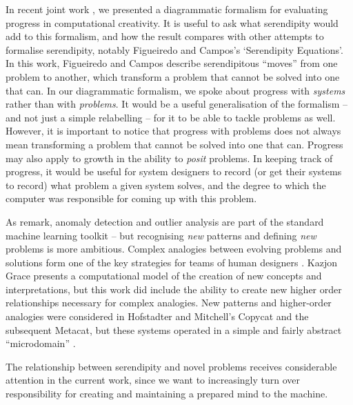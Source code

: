 In recent joint work \cite{colton-assessingprogress}, we presented a
diagrammatic formalism for evaluating progress in computational
creativity.  It is useful to ask what serendipity would add to this
formalism, and how the result compares with other attempts to
formalise serendipity, notably Figueiredo and Campos's
\citeyear{Figueiredo2001} `Serendipity Equations'.  In this work,
Figueiredo and Campos describe serendipitous ``moves'' from one
problem to another, which transform a problem that cannot be solved
into one that can.  In our diagrammatic formalism, we spoke about
progress with \emph{systems} rather than with \emph{problems}.  It
would be a useful generalisation of the formalism -- and not just a
simple relabelling -- for it to be able to tackle problems as well.
However, it is important to notice that progress with problems does not always mean transforming a
problem that cannot be solved into one that can.  Progress may also
apply to growth in the ability to \emph{posit} problems.  In keeping
track of progress, it would be useful for system designers to record
(or get their systems to record) what problem a given system solves,
and the degree to which the computer was responsible for coming up
with this problem.

As \cite[p. 69]{pease2013discussion} remark, anomaly detection and
outlier analysis are part of the standard machine learning toolkit --
but recognising \emph{new} patterns and defining \emph{new} problems
is more ambitious.  Complex analogies between evolving problems and
solutions form one of the key strategies for teams of human designers
\cite{Analogical-problem-evolution-DCC}.  Kazjon Grace
\citeyear{kaz-thesis} presents a computational model of the creation
of new concepts and interpretations, but this work did include the
ability to create new higher order relationships necessary for complex
analogies.  New patterns and higher-order analogies were considered in
Hofstadter and Mitchell's {\sf Copycat} and the subsequent {\sf
  Metacat}, but these systems operated in a simple and fairly abstract
``microdomain''
\cite{hofstadter1994copycat,DBLP:journals/jetai/Marshall06}.

The relationship between serendipity and novel problems receives
considerable attention in the current work, since we want to
increasingly turn over responsibility for creating and maintaining a
prepared mind to the machine.
